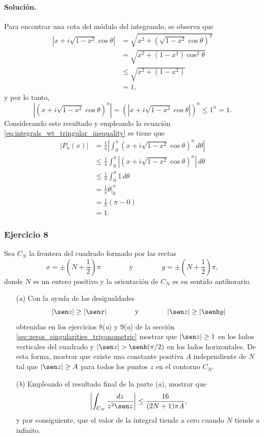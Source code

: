 \documentclass[a4paper]{report}
\begin{document}
\paragraph{Solución.} Para encontrar una cota del módulo del integrando, se observa que 
\begin{align*}
 |x+i\sqrt{1-x^2}\cos\theta|&=\sqrt{x^2+\left(\sqrt{1-x^2}\cos\theta\right)^2}\\
   &=\sqrt{x^2+(1-x^2)\cos^2\theta}\\
   &\leq\sqrt{x^2+(1-x^2)}\\
   &=1,
\end{align*}
y por lo tanto,
\[
 |(x+i\sqrt{1-x^2}\cos\theta)^n|=(|x+i\sqrt{1-x^2}\cos\theta|)^n\leq1^n=1.
\]
Considerando este resultado y empleando la ecuación \ref{eq:integrals_wt_tringular_inequality} se tiene que
\begin{align*}
 |P_n(x)|&=\frac{1}{\pi}\left|\int_0^\pi(x+i\sqrt{1-x^2}\cos\theta)^n\,d\theta\right|\\
   &\leq\frac{1}{\pi}\int_0^\pi\left|(x+i\sqrt{1-x^2}\cos\theta)^n\right|\,d\theta\\
   &\leq\frac{1}{\pi}\int_0^\pi1\,d\theta\\
   &=\frac{1}{\pi}\theta\bigg|_0^\pi\\
   &=\frac{1}{\pi}(\pi-0)\\
   &=1.
\end{align*}

\subsubsection{Ejercicio 8}

Sea \(C_N\) la frontera del cuadrado formado por las rectas 
\[
 x=\pm\left(N+\frac{1}{2}\right)\pi
 \qquad\qquad\textrm{y}\qquad\qquad
 y=\pm\left(N+\frac{1}{2}\right)\pi,
\]
donde \(N\) es un entero positivo y la orientación de \(C_N\) es en sentido antihorario.
\begin{enumerate}
 \item[(\textit{a})] Con la ayuda de las desigualdades
 \[
  |\sen z|\geq|\sen x|
  \qquad\qquad\textrm{y}\qquad\qquad
  |\sen z|\geq|\senh y|
 \]
 obtenidas en los ejercicios 8(\textit{a}) y 9(\textit{a}) de la sección \ref{sec:zeros_singularities_trigonometric} mostrar que \(|\sen z|\geq1\) en los lados verticales del cuadrado y \(|\sen z|>\senh(\pi/2)\) en los lados horizontales. De esta forma, mostrar que existe una constante positiva \(A\) independiente de \(N\) tal que \(|\sen z|\geq A\) para todos los puntos \(z\) en el contorno \(C_N\).
 \item[(\textit{b})] Empleando el resultado final de la parte (\textit{a}), mostrar que 
 \[
  \left|\int_{C_N}\frac{dz}{z^2\sen z}\right|\leq\frac{16}{(2N+1)\pi A},
 \]
 y por consiguiente, que el valor de la integral tiende a cero cuando \(N\) tiende a infinito.
\end{enumerate}
\end{document}
